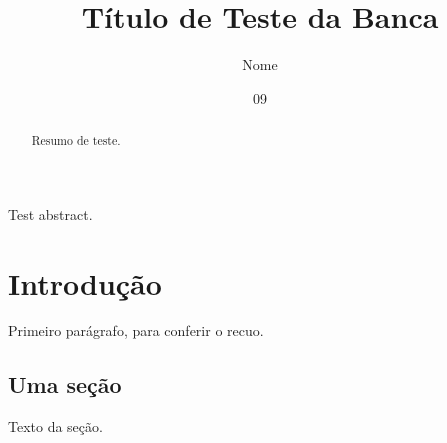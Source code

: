 \documentclass[dsc,dadoscoleta]{ufrj}
\title{Título de Teste da Banca}
\author{Nome}{de Teste}
\date{09}{2026}
\begin{document}
  \maketitle
  \frontmatter
  \begin{abstract}
    Resumo de teste.
  \end{abstract}
  \begin{foreignabstract}
    Test abstract.
  \end{foreignabstract}
  \tableofcontents
  \mainmatter
  \chapter{Introdução}
    Primeiro parágrafo, para conferir o recuo.
  \section{Uma seção}
    Texto da seção.
\end{document}
